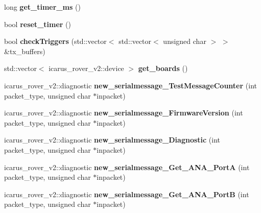 \begin{DoxyCompactItemize}
\mbox{\label{classGPIONodeProcess_af0bd6bfc965a8443be292662fda1b90c}} 
long {\bfseries get\+\_\+timer\+\_\+ms} ()
\item 
\mbox{\label{classGPIONodeProcess_aad6611619f9261801d88d1d6abe5ff61}} 
bool {\bfseries reset\+\_\+timer} ()
\item 
\mbox{\label{classGPIONodeProcess_ab763502635e85504c4f69f7439a8980b}} 
bool {\bfseries check\+Triggers} (std\+::vector$<$ std\+::vector$<$ unsigned char $>$ $>$ \&tx\+\_\+buffers)
\item 
\mbox{\label{classGPIONodeProcess_a0895166d9796c0bf8bbd6efe87b17136}} 
std\+::vector$<$ icarus\+\_\+rover\+\_\+v2\+::device $>$ {\bfseries get\+\_\+boards} ()
\item 
\mbox{\label{classGPIONodeProcess_ab9c4538284e515c2f697257f7473073b}} 
icarus\+\_\+rover\+\_\+v2\+::diagnostic {\bfseries new\+\_\+serialmessage\+\_\+\+Test\+Message\+Counter} (int packet\+\_\+type, unsigned char $\ast$inpacket)
\item 
\mbox{\label{classGPIONodeProcess_a1fdf9c6de6788297bb51fb27488d0fe7}} 
icarus\+\_\+rover\+\_\+v2\+::diagnostic {\bfseries new\+\_\+serialmessage\+\_\+\+Firmware\+Version} (int packet\+\_\+type, unsigned char $\ast$inpacket)
\item 
\mbox{\label{classGPIONodeProcess_a0fafde92540cdca0922fef34910b6c96}} 
icarus\+\_\+rover\+\_\+v2\+::diagnostic {\bfseries new\+\_\+serialmessage\+\_\+\+Diagnostic} (int packet\+\_\+type, unsigned char $\ast$inpacket)
\item 
\mbox{\label{classGPIONodeProcess_aa8b361106864bde09d1b14ba21d52cd5}} 
icarus\+\_\+rover\+\_\+v2\+::diagnostic {\bfseries new\+\_\+serialmessage\+\_\+\+Get\+\_\+\+A\+N\+A\+\_\+\+PortA} (int packet\+\_\+type, unsigned char $\ast$inpacket)
\item 
\mbox{\label{classGPIONodeProcess_a3f679467f3f364cb076a32ec951bccfb}} 
icarus\+\_\+rover\+\_\+v2\+::diagnostic {\bfseries new\+\_\+serialmessage\+\_\+\+Get\+\_\+\+A\+N\+A\+\_\+\+PortB} (int packet\+\_\+type, unsigned char $\ast$inpacket)

\end{DoxyCompactItemize}
